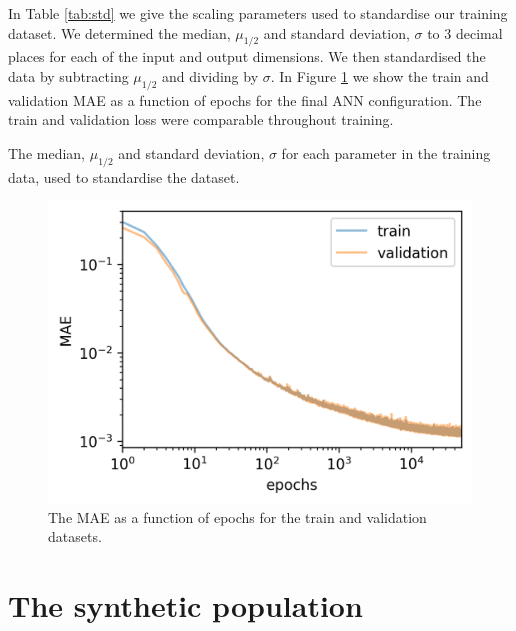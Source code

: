 \documentclass[a4paper,fleqn,usenatbib]{mnras}
\begin{document}

In Table \ref{tab:std} we give the scaling parameters used to standardise our training dataset. We determined the median, $\mu_{1/2}$ and standard deviation, $\sigma$ to 3 decimal places for each of the input and output dimensions. We then standardised the data by subtracting $\mu_{1/2}$ and dividing by $\sigma$. In Figure \ref{fig:loss} we show the train and validation MAE as a function of epochs for the final ANN configuration. The train and validation loss were comparable throughout training.

\begin{table}
    \caption{The median, $\mu_{1/2}$ and standard deviation, $\sigma$ for each parameter in the training data, used to standardise the dataset.}
    \label{tab:std}
    
\end{table}

\begin{figure}
    \centering
    \includegraphics[width=\linewidth]{figures/loss.png}
    \caption{The MAE as a function of epochs for the train and validation datasets.}
    \label{fig:loss}
\end{figure}

\section{The synthetic population}\label{sec:test-stars}

\end{document}
